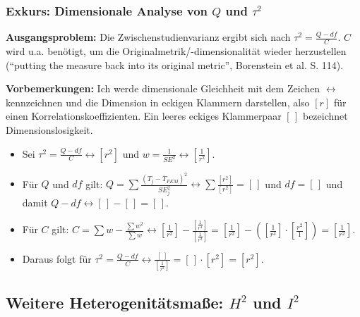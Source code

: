 \newcommand{\lr}{\leftrightarrow}
\begin{frame}[plain]
  \frametitle{Exkurs: Dimensionale Analyse von $Q$ und $\tau^2$}
  \begin{small}
    \textbf{Ausgangsproblem:} Die Zwischenstudienvarianz ergibt sich nach
    $\tau^2 = \frac {Q-df}{C}$. $C$ wird u.a. benötigt, um die
    Originalmetrik/-dimensionalität wieder herzustellen ("`putting the measure
    back into its original metric"', Borenstein et al. S. 114).

    \textbf{Vorbemerkungen:} Ich werde dimensionale Gleichheit mit dem Zeichen
    $\leftrightarrow$ kennzeichnen und die Dimension in eckigen Klammern
    darstellen, also $[r]$ für einen Korrelationskoeffizienten. Ein leeres
    eckiges Klammerpaar $[\,]$ bezeichnet Dimensionslosigkeit.

    \begin{itemize}
    \item Sei $\tau^2 = \frac {Q-df}{C} \lr [r^2] $ und $w = \frac{1}{SE^2} \lr
      [\frac{1}{r^2}]$.
    \item Für $Q$ und $df$ gilt: $Q = \sum \frac
      {(T_j-\overline{T}_{FEM})^2}{SE_j^2} \lr \sum\frac{[r^2]}{[r^2]} = [\,]$
      und $df=[\,]$ und damit $Q-df \lr [\,]-[\,] = [\,]$.
    \item Für $C$ gilt: $C=\sum w - \frac {\sum w^2}{\sum w} \lr [\frac
      {1}{r^2}] - \frac{[\frac {1}{r^4}]}{[\frac {1}{r^2}]} = [\frac {1}{r^2}] -
      ([\frac {1}{r^4}] \cdot [\frac {r^2}{1}]) = [\frac{1}{r^2}]$.
    \item Daraus folgt für $\tau^2 = \frac{Q-df}{C} \lr
      \frac{[\,]}{[\frac{1}{r^2}]} = [\,]\cdot [r^2] = [r^2]$.
    \end{itemize}
  \end{small}
\end{frame}



\subsection{Weitere Heterogenitätsmaße: $H^2$ und $I^2$}


